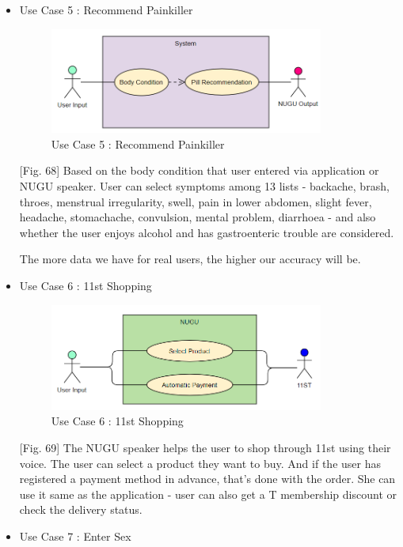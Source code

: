 \documentclass[conference]{IEEEtran}
\begin{document}
\begin{itemize}
    \item Use Case 5 : Recommend Painkiller
    
    \begin{figure}[ht]
    \includegraphics[width=9cm, center]{pillreco.PNG}
    \caption{Use Case 5 : Recommend Painkiller}
    \label{fig68}
    \end{figure}
    
   \setlength{\parindent}{2ex} [Fig. 68] Based on the body condition that user entered via application or NUGU speaker. User can select symptoms among 13 lists - backache, brash, throes, menstrual irregularity, swell, pain in lower abdomen, slight fever, headache, stomachache, convulsion, mental problem, diarrhoea - and also whether the user enjoys alcohol and has gastroenteric trouble are considered. 
    
   \setlength{\parindent}{2ex} The more data we have for real users, the higher our accuracy will be.
    
    \item Use Case 6 : 11st Shopping
    
    \begin{figure}[ht]
    \includegraphics[width=9cm, center]{11st.PNG}
    \caption{Use Case 6 : 11st Shopping}
    \label{fig69}
    \end{figure}
    \setlength{\parindent}{2ex}[Fig. 69] The NUGU speaker helps the user to shop through 11st using their voice. 
    The user can select a product they want to buy. And if the user has registered a payment method in advance, that's done with the order. 
    She can use it same as the application - user can also get a T membership discount or check the delivery status. 
    
    \item Use Case 7 : Enter Sex
    

\end{itemize}
\end{document}
